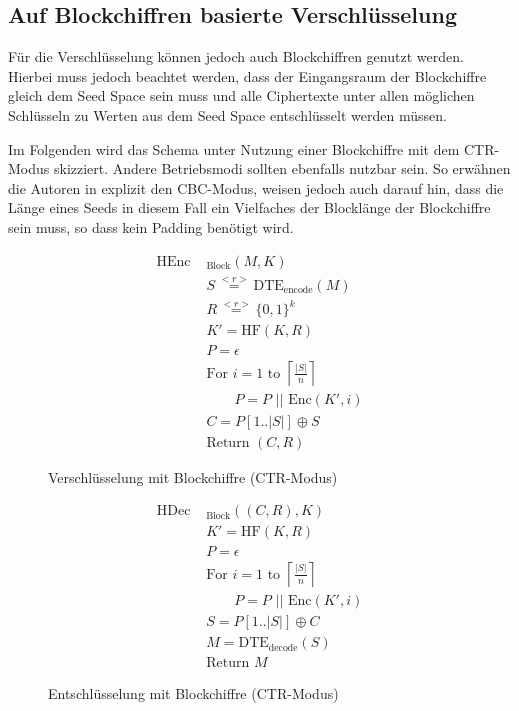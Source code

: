 \subsection{Auf Blockchiffren basierte Verschlüsselung}

Für die Verschlüsselung können jedoch auch Blockchiffren genutzt werden. Hierbei muss jedoch beachtet werden, dass der Eingangsraum der Blockchiffre gleich dem Seed Space sein muss und alle Ciphertexte unter allen möglichen Schlüsseln zu Werten aus dem Seed Space entschlüsselt werden müssen.

Im Folgenden wird das Schema unter Nutzung einer Blockchiffre mit dem CTR-Modus skizziert. Andere Betriebsmodi sollten ebenfalls nutzbar sein. So erwähnen die Autoren in \cite{EURO2014} explizit den CBC-Modus, weisen jedoch auch darauf hin, dass die Länge eines Seeds in diesem Fall ein Vielfaches der Blocklänge der Blockchiffre sein muss, so dass kein Padding benötigt wird. 

\begin{figure}[h]
	\begin{minipage}[b]{0.5\textwidth}
		\begin{align*}
			\text{HEnc }&_{\text{Block}}(M, K)\\
			&S \overset{<r>}{=} \text{DTE}_{\text{encode}}(M)\\ 	%
			&R \overset{<r>}{=} \{0,1\}^k\\	%
			&K' = \text{HF}(K,R)\\ 		%
			&P = \epsilon \\
			&\text{For } i = 1 \text{ to } \left\lceil \frac{|S|}{n} \right\rceil \\
			&\qquad P = P \text{ || Enc}(K',i)\\	%
			&C = P[1 .. |S|] \oplus S\\	%
			&\text{Return } (C,R)
		\end{align*}
		\caption{Verschlüsselung mit Blockchiffre (CTR-Modus)}
		\label{fig:BlockEnc}
	\end{minipage}
	\begin{minipage}[b]{0.5\textwidth}
		\begin{align*}
			\text{HDec }&_{\text{Block}}((C,R), K)\\
			&K' = \text{HF}(K,R)\\ 		%
			&P = \epsilon \\
			&\text{For } i = 1 \text{ to } \left\lceil \frac{|S|}{n} \right\rceil \\
			&\qquad P = P \text{ || Enc}(K',i)\\	%
			&S = P[1 .. |S|] \oplus C\\	%
			&M = \text{DTE}_{\text{decode}}(S)\\ 	%
			&\text{Return } M
		\end{align*}
		\caption{Entschlüsselung mit Blockchiffre (CTR-Modus)}
		\label{fig:BlockDec}
	\end{minipage}
\end{figure}

